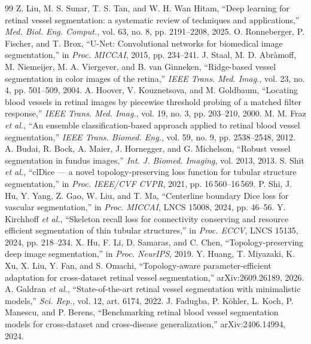 \documentclass[conference]{IEEEtran}
\begin{document}
\begin{thebibliography}{99}
 Z. Liu, M. S. Sunar, T. S. Tan, and W. H. Wan Hitam, ``Deep learning for retinal vessel segmentation: a systematic review of techniques and applications,'' \emph{Med. Biol. Eng. Comput.}, vol. 63, no. 8, pp. 2191--2208, 2025.
 O. Ronneberger, P. Fischer, and T. Brox, ``U-Net: Convolutional networks for biomedical image segmentation,'' in \emph{Proc. MICCAI}, 2015, pp. 234--241.
 J. Staal, M. D. Abr\`amoff, M. Niemeijer, M. A. Viergever, and B. van Ginneken, ``Ridge-based vessel segmentation in color images of the retina,'' \emph{IEEE Trans. Med. Imag.}, vol. 23, no. 4, pp. 501--509, 2004.
 A. Hoover, V. Kouznetsova, and M. Goldbaum, ``Locating blood vessels in retinal images by piecewise threshold probing of a matched filter response,'' \emph{IEEE Trans. Med. Imag.}, vol. 19, no. 3, pp. 203--210, 2000.
 M. M. Fraz \emph{et al.}, ``An ensemble classification-based approach applied to retinal blood vessel segmentation,'' \emph{IEEE Trans. Biomed. Eng.}, vol. 59, no. 9, pp. 2538--2548, 2012.
 A. Budai, R. Bock, A. Maier, J. Hornegger, and G. Michelson, ``Robust vessel segmentation in fundus images,'' \emph{Int. J. Biomed. Imaging}, vol. 2013, 2013.
 S. Shit \emph{et al.}, ``clDice --- a novel topology-preserving loss function for tubular structure segmentation,'' in \emph{Proc. IEEE/CVF CVPR}, 2021, pp. 16\,560--16\,569.
 P. Shi, J. Hu, Y. Yang, Z. Gao, W. Liu, and T. Ma, ``Centerline boundary Dice loss for vascular segmentation,'' in \emph{Proc. MICCAI}, LNCS 15008, 2024, pp. 46--56.
 Y. Kirchhoff \emph{et al.}, ``Skeleton recall loss for connectivity conserving and resource efficient segmentation of thin tubular structures,'' in \emph{Proc. ECCV}, LNCS 15135, 2024, pp. 218--234.
 X. Hu, F. Li, D. Samaras, and C. Chen, ``Topology-preserving deep image segmentation,'' in \emph{Proc. NeurIPS}, 2019.
 Y. Huang, T. Miyazaki, K. Xu, X. Liu, Y. Fan, and S. Omachi, ``Topology-aware parameter-efficient adaptation for cross-dataset retinal vessel segmentation,'' arXiv:2609.26189, 2026.
 A. Galdran \emph{et al.}, ``State-of-the-art retinal vessel segmentation with minimalistic models,'' \emph{Sci. Rep.}, vol. 12, art. 6174, 2022.
 J. Fadugba, P. K\"ohler, L. Koch, P. Manescu, and P. Berens, ``Benchmarking retinal blood vessel segmentation models for cross-dataset and cross-disease generalization,'' arXiv:2406.14994, 2024.

\end{thebibliography}
\end{document}
